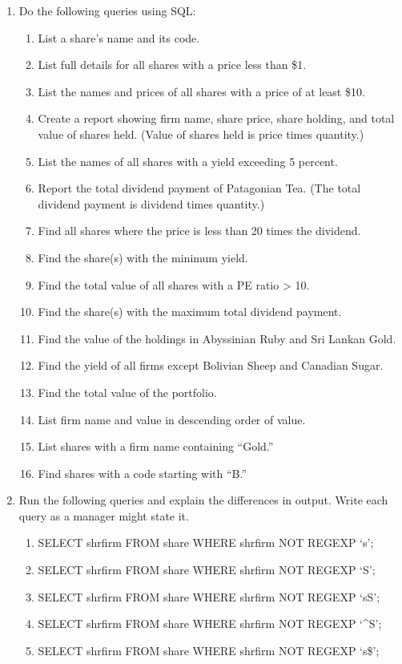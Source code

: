 \documentclass[
]{article}
\begin{document}
\begin{enumerate}
\def\labelenumi{\arabic{enumi}.}
\item
  Do the following queries using SQL:

  \begin{enumerate}
  \def\labelenumii{\alph{enumii}.}
  \item
    List a share's name and its code.
  \item
    List full details for all shares with a price less than \$1.
  \item
    List the names and prices of all shares with a price of at least
    \$10.
  \item
    Create a report showing firm name, share price, share holding, and
    total value of shares held. (Value of shares held is price times
    quantity.)
  \item
    List the names of all shares with a yield exceeding 5 percent.
  \item
    Report the total dividend payment of Patagonian Tea. (The total
    dividend payment is dividend times quantity.)
  \item
    Find all shares where the price is less than 20 times the dividend.
  \item
    Find the share(s) with the minimum yield.
  \item
    Find the total value of all shares with a PE ratio \textgreater{}
    10.
  \item
    Find the share(s) with the maximum total dividend payment.
  \item
    Find the value of the holdings in Abyssinian Ruby and Sri Lankan
    Gold.
  \item
    Find the yield of all firms except Bolivian Sheep and Canadian
    Sugar.
  \item
    Find the total value of the portfolio.
  \item
    List firm name and value in descending order of value.
  \item
    List shares with a firm name containing ``Gold.''
  \item
    Find shares with a code starting with ``B.''
  \end{enumerate}
\item
  Run the following queries and explain the differences in output. Write
  each query as a manager might state it.

  \begin{enumerate}
  \def\labelenumii{\alph{enumii}.}
  \item
    SELECT shrfirm FROM share WHERE shrfirm NOT REGEXP `s';
  \item
    SELECT shrfirm FROM share WHERE shrfirm NOT REGEXP `S';
  \item
    SELECT shrfirm FROM share WHERE shrfirm NOT REGEXP `s\textbar S';
  \item
    SELECT shrfirm FROM share WHERE shrfirm NOT REGEXP `\^{}S';
  \item
    SELECT shrfirm FROM share WHERE shrfirm NOT REGEXP `s\$';
  \end{enumerate}
\end{enumerate}
\end{document}
